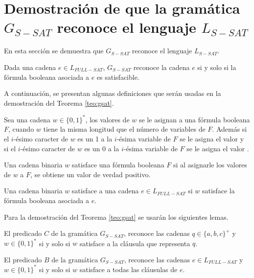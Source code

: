\section{Demostración de que la gramática $G_{S-SAT}$ reconoce el lenguaje $L_{S-SAT}$}

En esta sección se demuestra que $G_{S-SAT}$ reconoce el lenguaje $L_{S-SAT}$.
\begin{theorem}
    \label{teo:gsat}
    Dada una cadena $e\in L_{FULL-SAT}$, $G_{S-SAT}$ reconoce la cadena $e$ si y solo si la fórmula booleana asociada a $e$ es satisfacible. 
\end{theorem}

A continuación, se presentan algunas definiciones que serán usadas en la demostración del Teorema \ref{teo:gsat}.

\begin{definition}
    Sea una cadena $w\in \{0,1\}^*$, los valores de $w$ se le asignan a una fórmula booleana $F$, cuando $w$ tiene la misma longitud
    que el número de variables de $F$. Además si el $i$-ésimo caracter de $w$ es un 1 a la $i$-ésima variable de $F$ se le asigna
    el valor \true{} y si el $i$-ésimo caracter de $w$ es un 0 a la $i$-ésima variable de $F$ se le asigna
    el valor \false{}.
\end{definition}

\begin{definition}
    Una cadena binaria $w$ satisface una fórmula booleana $F$ si al asignarle los valores de $w$ a $F$, se obtiene un valor de verdad positivo.
\end{definition}

\begin{definition}
    Una cadena binaria $w$ satisface a una cadena $e\in L_{FULL-SAT}$ si $w$ satisface la fórmula booleana asociada a $e$. 
\end{definition}

Para la demostración del Teorema \ref{teo:gsat} se usarán los siguientes lemas.

\begin{lemma}
    \label{lem:predc}
    El predicado $C$ de la gramática $G_{S-SAT}$, reconoce las cadenas $q\in \{a,b,c\}^+$ y $w\in \{0,1\}^*$ si y solo si $w$ satisface a la cláusula que representa $q$.  
\end{lemma}

\begin{lemma}
    \label{lem:predb}
    El predicado $B$ de la gramática $G_{S-SAT}$, reconoce las cadenas $e\in L_{FULL-SAT}$ y $w\in \{0,1\}^*$ si y solo si $w$ satisface a todas las cláusulas de $e$. 
\end{lemma}


